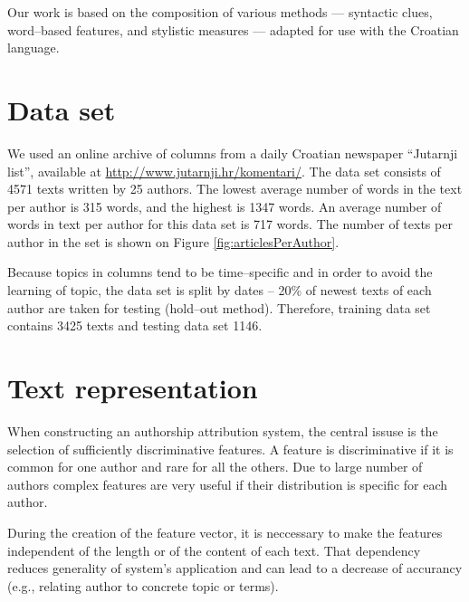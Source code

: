\documentclass[11pt,english]{article}
\begin{document}
\begin{multicols}{2}
Our work is based on the composition of various methods --- syntactic clues, word--based features, 
and stylistic measures --- adapted for use with the Croatian language. 

\section{Data set}
\label{sec:podatci}
We used an online archive of columns from a daily Croatian newspaper ``Jutarnji
list'', available at \url{http://www.jutarnji.hr/komentari/}. The data set
consists of 4571 texts written by 25 authors. The lowest average number of words
in the text per author is 315 words, and the highest is 1347 words. An average number
of words in text per author for this data set is 717 words. The number of texts per
author in the set is shown on Figure \ref{fig:articlesPerAuthor}.

Because topics in columns tend to be time--specific and in order to avoid the
learning of topic, the data set is split by dates -- 20\% of newest texts of
each author are taken for testing (hold--out method). Therefore, training data
set contains 3425 texts and testing data set 1146.

\begin{minipage}{0.8\linewidth}
\vspace{10pt}
\centerline{\resizebox{1.4\linewidth}{!}{}}%
%
\label{fig:articlesPerAuthor}
\end{minipage}

\section{Text representation}
When constructing an authorship attribution system, the central issuse is the selection of sufficiently discriminative features. A feature is
discriminative if it is common for one author and rare for all the others. Due to large number of authors complex features are very useful if their
distribution is specific for each author. %


During the creation of the feature vector, it is neccessary to make the
features independent of the length or of the content of each text. That
dependency reduces generality of system's application and can lead to a decrease of accurancy
(e.g., relating author to concrete topic or terms).


\end{multicols}
\end{document}
